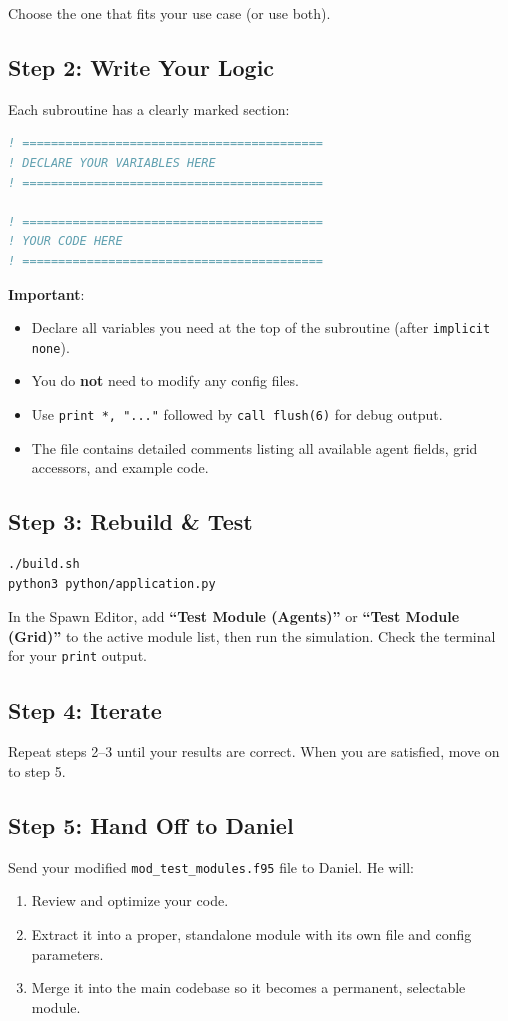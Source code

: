Choose the one that fits your use case (or use both).

\subsection{Step 2: Write Your Logic}
Each subroutine has a clearly marked section:
\begin{lstlisting}[language=Fortran]
! ==========================================
! DECLARE YOUR VARIABLES HERE
! ==========================================

! ==========================================
! YOUR CODE HERE
! ==========================================
\end{lstlisting}

\textbf{Important}:
\begin{itemize}
    \item Declare all variables you need at the top of the subroutine (after \texttt{implicit none}).
    \item You do \textbf{not} need to modify any config files.
    \item Use \texttt{print *, "..."} followed by \texttt{call flush(6)} for debug output.
    \item The file contains detailed comments listing all available agent fields, grid accessors, and example code.
\end{itemize}

\subsection{Step 3: Rebuild \& Test}
\begin{lstlisting}[language=bash]
./build.sh
python3 python/application.py
\end{lstlisting}
In the Spawn Editor, add \textbf{``Test Module (Agents)''} or \textbf{``Test Module (Grid)''} to the active module list, then run the simulation. Check the terminal for your \texttt{print} output.

\subsection{Step 4: Iterate}
Repeat steps 2--3 until your results are correct. When you are satisfied, move on to step 5.

\subsection{Step 5: Hand Off to Daniel}
Send your modified \texttt{mod\_test\_modules.f95} file to Daniel. He will:
\begin{enumerate}
    \item Review and optimize your code.
    \item Extract it into a proper, standalone module with its own file and config parameters.
    \item Merge it into the main codebase so it becomes a permanent, selectable module.
\end{enumerate}


